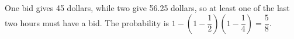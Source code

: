 One bid gives 45 dollars, while two give 56.25 dollars, so at least one of the last two hours must have a bid. The probability is $1-(1-\dfrac{1}{2})(1-\dfrac{1}{4})=\boxed{\dfrac{5}{8}}$.
